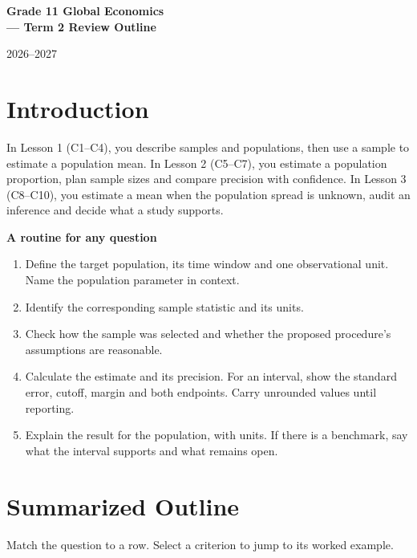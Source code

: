 \begin{center}
  {\LARGE\bfseries Grade 11 Global Economics\\[2pt]--- Term 2 Review Outline\par}
  \smallskip
  {\large 2026--2027\par}
\end{center}

\setcounter{tocdepth}{1}
\label{toc}
\tableofcontents

\section{Introduction}

In Lesson 1 (C1--C4), you describe samples and populations, then use a sample to estimate a population mean. In Lesson 2 (C5--C7), you estimate a population proportion, plan sample sizes and compare precision with confidence. In Lesson 3 (C8--C10), you estimate a mean when the population spread is unknown, audit an inference and decide what a study supports.

\textbf{A routine for any question}
\begin{enumerate}
  \item Define the target population, its time window and one observational unit. Name the population parameter in context.
  \item Identify the corresponding sample statistic and its units.
  \item Check how the sample was selected and whether the proposed procedure's assumptions are reasonable.
  \item Calculate the estimate and its precision. For an interval, show the standard error, cutoff, margin and both endpoints. Carry unrounded values until reporting.
  \item Explain the result for the population, with units. If there is a benchmark, say what the interval supports and what remains open.
\end{enumerate}

\par\nobreak
\secInicio

\clearpage
\section{Summarized Outline}\label{sec:summary}

Match the question to a row. Select a criterion to jump to its worked example.

